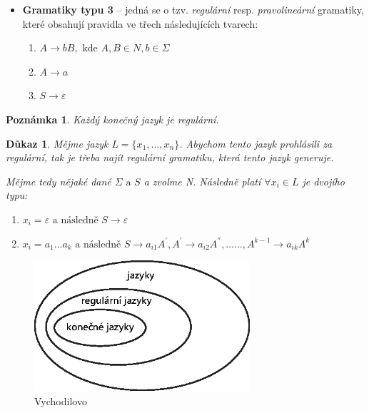 \documentclass[10pt, a4paper, titlepage]{article}
\theoremstyle{note}
\newtheorem{dukaz}{\textbf{Důkaz}}
\newtheorem{poznamka}{\textbf{Poznámka}}
\begin{document}
\begin{itemize}
\item
\textbf{Gramatiky typu 3\label{gram-3}} -- jedná se o tzv. \emph{regulární} resp. \emph{pravolineární} gramatiky, které obsahují pravidla ve třech následujících tvarech:

\begin{enumerate}
\item
$A \rightarrow bB, \text{ kde } A,B \in N, b \in \Sigma$

\item
$A \rightarrow a$

\item
$S \rightarrow \varepsilon$
\end{enumerate}

\end{itemize}

\begin{poznamka}
Každý konečný jazyk je regulární.
\end{poznamka}

\begin{dukaz}
Mějme jazyk $L = \lbrace x_{1},\ldots, x_{n} \rbrace$. Abychom tento jazyk prohlásili za regulární, tak je třeba najít regulární gramatiku,
která tento jazyk generuje.

Mějme tedy nějaké dané $\Sigma \text{ a } S$ a zvolme \emph{N}. Následně platí $\forall x_{i} \in L$ je dvojího typu:

\begin{enumerate}
\item
$x_{i} = \varepsilon \text{ a následně } S \rightarrow \varepsilon$

\item
$x_{i} = a_{1}\ldots a_{k} \text{ a následně } S \rightarrow a_{i1}A^{'}, A^{'} \rightarrow a_{i2}A^{''},\ldots\ldots, A^{k-1} \rightarrow a_{ik}A^{k}$
\end{enumerate}
\end{dukaz}

\begin{figure}[ht]
\centering\includegraphics[width=8cm]{vajicko-1.eps}
\caption{Vychodilovo }\label{obr-2}
\end{figure}
\end{document}
